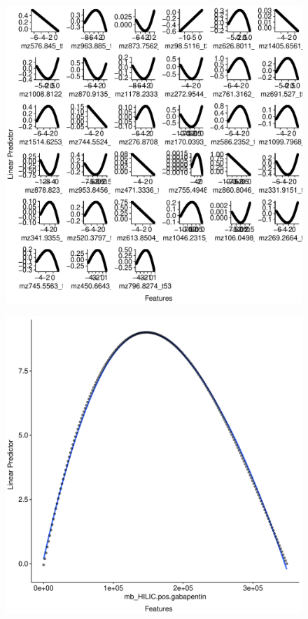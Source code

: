 \documentclass[AMA,STIX1COL,]{WileyNJD-v2}
\begin{document}
\clearpage
\begin{figure}[h]
\includegraphics{Figs/ECB_plot}
\end{figure}

\clearpage

\begin{figure}[h]
\includegraphics{Figs/WLM_plot}
\end{figure}
\end{document}
